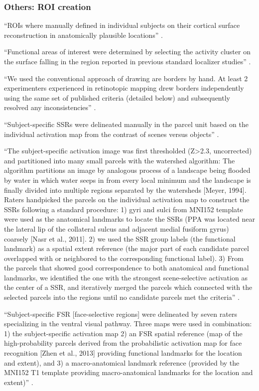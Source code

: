 \subsubsection{Others: ROI creation}

%
``ROIs where manually defined in individual subjects on their cortical surface
reconstruction in anatomically plausible locations''
\citep{rosenke2021probabilistic}.

%
``Functional areas of interest were determined by selecting the activity cluster
on the surface falling in the region reported in previous standard localizer
studies'' \citep{frost2012measuring}.


%
``We used the conventional approach of drawing are borders by hand.
%
At least 2 experimenters experienced in retinotopic mapping drew borders
independently using the same set of published criteria (detailed below) and
subsequently resolved any inconsistencies'' \citep{wang2015probabilistic}.


%
``Subject-specific SSRs were delineated manually in the parcel unit based on the
individual activation map from the contrast of scenes versus objects''
\citep{zhen2017quantifying}.

%
``The subject-specific activation image was first thresholded (Z>2.3,
uncorrected) and partitioned into many small parcels with the watershed
algorithm:
%
The algorithm partitions an image by analogous process of a landscape being
flooded by water in which water seeps in from every local minimum and the
landscape is finally divided into multiple regions separated by the watersheds
[Meyer, 1994].
%
Raters handpicked the parcels on the individual activation map to construct the
SSRs following a standard procedure:
%
1) gyri and sulci from MNI152 template were used as the anatomical landmarks to
locate the SSRs (PPA was located near the lateral lip of the collateral sulcus
and adjacent medial fusiform gyrus) coarsely [Nasr et al., 2011].
%
2) we used the SSR group labels (the functional landmark) as a spatial extent
reference (the major part of each candidate parcel overlapped with or neighbored
to the corresponding functional label).
%
3) From the parcels that showed good correspondence to both anatomical and
functional landmarks, we identified the one with the strongest scene-selective
activation as the center of a SSR, and iteratively merged the parcels which
connected with the selected parcels into the regions until no candidate parcels
met the criteria'' \citep{zhen2017quantifying}.


%
``Subject-specific FSR [face-selective regions] were delineated by seven raters
specializing in the ventral visual pathway.
%
Three maps were used in combination:
%
1) the subject-specific activation map
%
2) an FSR spatial reference (map of the high-probability parcels derived from
the probabilistic activation map for face recognition [Zhen et al.,
2013] providing functional landmarks for the location and extent), and
%
3) a macro-anatomical landmark reference (provided by the MNI152 T1 template
providing macro-anatomical landmarks for the location and extent)''
\citep{zhen2015quantifying}.

